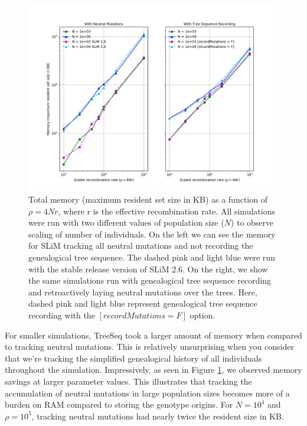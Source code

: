 \documentclass{article}
\begin{document}
\begin{figure}[h!tb]
	\begin{center}
  		\includegraphics[width=1.0\linewidth]{../figures/MemoryLog.png}
  		\caption{
		Total memory (maximum resident set size in KB) as a function of $\rho = 4Nr$, where r is the effective recombination rate.
		All simulations were run with two different values of population size ($N$) to observe scaling of number of individuals.
		On the left we can see the memory for SLiM tracking all neutral mutations 
		and not recording the genealogical tree sequence.
		The dashed pink and light blue were run with the stable release version of SLiM 2.6.
		On the right, we show the same simulations run with genealogical tree sequence recording and retroactively laying 
		neutral mutations over the trees.
		Here, dashed pink and light blue represent genealogical tree sequence recording with the $[recordMutations = F]$ option. 
		}
  		\label{fig:NonNeutralMemComp}
	\end{center}
\end{figure}



For smaller simulations, TreeSeq took a larger amount of memory when compared to tracking neutral mutations. 
This is relatively unsurprising when you consider that we're tracking the simplified genealogical history of all individuals throughout the simulation.
Impressively, as seen in Figure \ref{fig:NonNeutralMemComp}, we observed memory savings at larger parameter values.
This illustrates that tracking the accumulation of neutral mutations in large population sizes becomes more of a burden on RAM compared 
to storing the genotype origins. 
For $N = 10^{4}$ and $\rho = 10^{5}$, tracking neutral mutations had nearly twice the resident size in KB.
\end{document}
